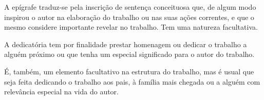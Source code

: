 



\frontmatter %

\pagestyle{plain} %

\maketitlepage


\makeconttitlepage


\begin{epigraph}
\null \vfill
\begin{flushright}

A epígrafe traduz-se pela inscrição de sentença conceituosa que, de algum modo inspirou o autor na elaboração do trabalho ou nas suas ações correntes, e que o mesmo considere importante revelar no trabalho. Tem uma natureza facultativa.

\end{flushright}
\vfill \null%
\end{epigraph}%



\begin{dedicatory}
\null \vfill
\begin{flushright}

A dedicatória tem por finalidade prestar homenagem ou dedicar o trabalho a alguém próximo ou que tenha um especial significado para o autor do trabalho. 

É, também, um elemento facultativo na estrutura do trabalho, mas é usual que seja feita dedicando o trabalho aos pais, à família mais chegada ou a alguém com relevância especial na vida do autor. 

\end{flushright}
\vfill \null%
\end{dedicatory}


